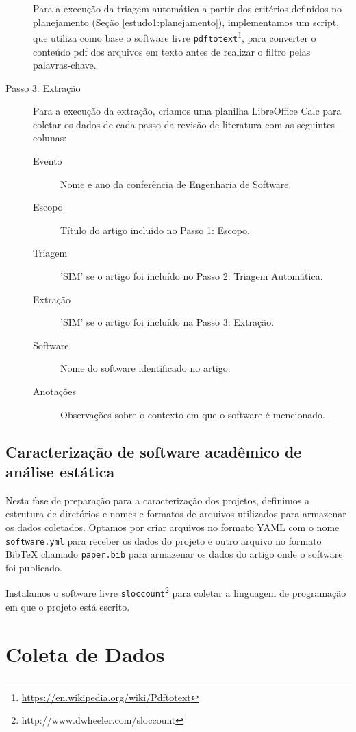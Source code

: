 \begin{description}
Para a execução da triagem automática a partir dos
critérios definidos no planejamento (Seção \ref{estudo1:planejamento}),
implementamos um script, que utiliza como base o software livre
\texttt{pdftotext}\footnote{\url{https://en.wikipedia.org/wiki/Pdftotext}}, para
converter o conteúdo pdf dos arquivos em texto antes de realizar o filtro pelas
palavras-chave.

  \item [Passo 3: Extração]

Para a execução da extração, criamos uma planilha LibreOffice Calc para coletar os dados de cada passo da
revisão de literatura com as seguintes colunas:

\begin{description}
  \item[Evento] Nome e ano da conferência de Engenharia de Software.
  \item[Escopo] Título do artigo incluído no Passo 1: Escopo.
  \item[Triagem] 'SIM' se o artigo foi incluído no Passo 2: Triagem Automática.
  \item[Extração] 'SIM' se o artigo foi incluído na Passo 3: Extração.
  \item[Software] Nome do software identificado no artigo.
  \item[Anotações] Observações sobre o contexto em que o software é mencionado.
\end{description}

\end{description}

\subsection{Caracterização de software acadêmico de análise estática}

Nesta fase de preparação para a caracterização dos projetos, definimos a
estrutura de diretórios e nomes e formatos de arquivos utilizados para
armazenar os dados coletados. Optamos por criar arquivos no formato YAML com o
nome \texttt{software.yml} para receber os dados do projeto e outro arquivo no
formato BibTeX chamado \texttt{paper.bib} para armazenar os dados do artigo
onde o software foi publicado.

Instalamos o software livre
\texttt{sloccount}\footnote{http://www.dwheeler.com/sloccount} para coletar a
linguagem de programação em que o projeto está escrito.


\section{Coleta de Dados} \label{estudo1:coleta} %

